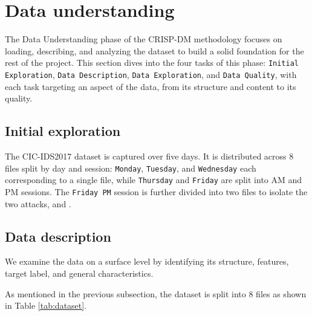 \section{Data understanding}

The Data Understanding phase of the CRISP-DM methodology focuses on loading, describing, and analyzing the dataset to build a solid foundation for the rest of the project. This section dives into the four tasks of this phase: \texttt{Initial Exploration}, \texttt{Data Description}, \texttt{Data Exploration}, and \texttt{Data Quality}, with each task targeting an aspect of the data, from its structure and content to its quality.

\subsection{Initial exploration}

The CIC-IDS2017 dataset is captured over five days. It is distributed across 8 files split by day and session: \texttt{Monday}, \texttt{Tuesday}, and \texttt{Wednesday} each corresponding to a single file, while \texttt{Thursday} and \texttt{Friday} are split into AM and PM sessions. The \texttt{Friday PM} session is further divided into two files to isolate the two attacks, \texttt{} and \texttt{}.

\subsection{Data description}
\label{Sec:Desc}

We examine the data on a surface level by identifying its structure, features, target label, and general characteristics.

As mentioned in the previous subsection, the dataset is split into 8 files as shown in Table \ref{tab:dataset}.

